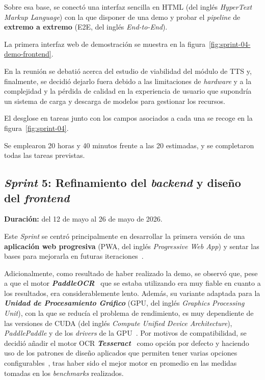 Sobre esa base, se conectó una interfaz sencilla en \acs{HTML} (del inglés
\textit{HyperText Markup Language}) con la que disponer de una demo y probar el \textit{pipeline} de \textbf{extremo a
extremo} (\acs{E2E}, del inglés \textit{End-to-End}).

La primera interfaz web de demostración se muestra en la figura~\ref{fig:sprint-04-demo-frontend}.


En la reunión se debatió acerca del estudio de viabilidad del módulo de \ac{TTS}
y, finalmente, se decidió dejarlo fuera debido a las limitaciones de
\textit{hardware} y a la complejidad y la pérdida de calidad en
la experiencia de usuario que supondría un sistema de carga y descarga de modelos
para gestionar los recursos.

El desglose en tareas junto con los campos asociados a cada una se
recoge en la figura~\ref{fig:sprint-04}.


Se emplearon 20 horas y 40 minutos frente a las 20 estimadas, y se
completaron todas las tareas previstas.

\subsection{\textit{Sprint} 5: Refinamiento del \textit{backend} y diseño del \textit{frontend}}
\textbf{Duración:} del 12 de mayo al 26 de mayo de 2026.

Este \textit{Sprint} se centró principalmente en desarrollar la primera versión de
una \textbf{aplicación web progresiva} (\acs{PWA}, del inglés
\textit{Progressive Web App}) y sentar las bases para mejorarla en
futuras iteraciones~\cite{mdn_pwa}.

Adicionalmente, como resultado de haber realizado la demo, se observó que, pese a
que el motor \textit{\textbf{PaddleOCR}}~\cite{paddleocr_tech_report} que se estaba
utilizando era muy fiable en cuanto a los resultados, era considerablemente lento. Además,
su variante adaptada para la \textbf{\textit{Unidad de Procesamiento Gráfico}}
(\acs{GPU}, del inglés \textit{Graphics Processing Unit}), con la que se reducía el
problema de rendimiento, es muy dependiente de las versiones de \acs{CUDA} (del inglés
\textit{Compute Unified Device Architecture}), \textit{PaddlePaddle} y de los
\textit{drivers} de la \ac{GPU}~\cite{paddlepaddle_install}. Por motivos de compatibilidad,
se decidió añadir el motor \ac{OCR} \textbf{\textit{Tesseract}}~\cite{tesseract_ocr} como
opción por defecto y haciendo uso de los patrones de diseño aplicados que permiten tener
varias opciones configurables~\cite{patterns}, tras haber sido el mejor motor en promedio
en las medidas tomadas en los \textit{benchmarks} realizados.


